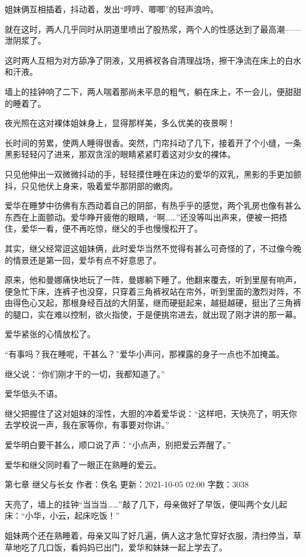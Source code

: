 \documentclass[12pt,UTF8]{ctexbook}
\begin{document}
姐妹俩互相插着，抖动着，发出“哼哼、唧唧”的轻声浪吟。

就在这时，两人几乎同时从阴道里喷出了股热浆，两个人的性感达到了最高潮——泄阴浆了。

这时两人互相为对方舔净了阴液，又用裤衩各自清理战场，擦干净流在床上的白水和汗液。

墙上的挂钟响了二下，两人喘着那尚未平息的粗气，躺在床上，不一会儿，便甜甜的睡着了。

夜光照在这对裸体姐妹身上，显得那样美，多么优美的夜景啊！

长时间的劳累，使两人睡得很香。突然，门帘抖动了几下，接着开了个小缝，一条黑影轻轻闪了进来，那双贪淫的眼睛紧紧盯着这对少女的裸体。

只见他伸出一双微微抖动的手，轻轻摸住睡在床边的爱华的双乳，黑影的手更加颤抖，只见他伏上身来，吸着爱华那阴部的嫩肉。

爱华在睡梦中彷佛有东西动着自己的阴部，有热乎乎的感觉，两个乳房也像有甚么东西在上面颤动。爱华睁开疲倦的眼睛，“啊……”还没等叫出声来，便被一把捂住，爱华一看，便不再吃惊，继父的手也慢慢松开了。

其实，继父经常逗这姐妹俩，此时爱华当然不觉得有甚么可奇怪的了，不过像今晚的情景还是第一回，爱华有点不好意思了。

原来，他和曼娜痛快地玩了一阵，曼娜躺下睡了。他翻来覆去，听到里屋有响声，便急忙下床，连裤子也没穿，只穿着三角裤衩站在帘外，听到里面的激烈对阵，不由得色心又起，那根身经百战的大阴茎，继而硬挺起来，越挺越硬，挺出了三角裤的腿口，实在难以控制，欲火指使，于是便挑帘进去，就出现了刚才讲的那一幕。

爱华紧张的心情放松了。

“有事吗？我在睡呢，干甚么？”爱华小声问，那裸露的身子一点也不加掩盖。

继父说：“你们刚才干的一切，我都知道了。”

爱华低头不语。

继父把握住了这对姐妹的淫性，大胆的冲着爱华说：“这样吧，天快亮了，明天你去学校说一声，我在家等你，有事要对你讲。”

爱华明白要干甚么，顺口说了声：“小点声，别把爱云弄醒了。”

爱华和继父同时看了一眼正在熟睡的爱云。

第七章 继父与长女
作者：佚名      更新：2021-10-05 02:00      字数：3038

天亮了，墙上的挂钟“当当当……”敲了几下，母亲做好了早饭，便叫两个女儿起床：“小华，小云，起床吃饭！”

姐妹两个还在熟睡着，母亲又叫了好几遍，俩人这才急忙穿好衣服，清扫停当，草草地吃了几口饭，看妈妈已出门，爱华和妹妹一起上学去了。
\end{document}
